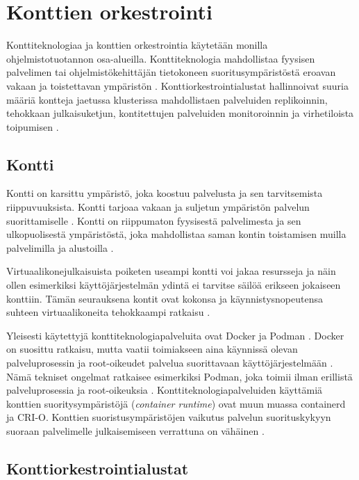 \chapter{Konttien orkestrointi\label{orchestration}}

Konttiteknologiaa ja konttien orkestrointia käytetään monilla ohjelmistotuotannon osa-alueilla.
Konttiteknologia mahdollistaa fyysisen palvelimen tai ohjelmistökehittäjän tietokoneen suoritusympäristöstä eroavan vakaan ja toistettavan ympäristön \cite{Watada19}.
Konttiorkestrointialustat hallinnoivat suuria määriä kontteja jaetussa klusterissa mahdollistaen palveluiden replikoinnin, tehokkaan julkaisuketjun, kontitettujen palveluiden monitoroinnin ja virhetiloista toipumisen \cite{Khan17}.

\section{Kontti\label{container}}

Kontti on karsittu ympäristö, joka koostuu palvelusta ja sen tarvitsemista riippuvuuksista.
Kontti tarjoaa vakaan ja suljetun ympäristön palvelun suorittamiselle \cite{Watada19}.
Kontti on riippumaton fyysisestä palvelimesta ja sen ulkopuolisestä ympäristöstä, joka mahdollistaa saman kontin toistamisen muilla palvelimilla ja alustoilla \cite{Saha18}.

Virtuaalikonejulkaisuista poiketen useampi kontti voi jakaa resursseja ja näin ollen esimerkiksi käyttöjärjestelmän ydintä ei tarvitse säilöä erikseen jokaiseen konttiin.
Tämän seurauksena kontit ovat kokonsa ja käynnistysnopeutensa suhteen virtuaalikoneita tehokkaampi ratkaisu \cite{Dua14}.

Yleisesti käytettyjä konttiteknologiapalveluita ovat Docker ja Podman \cite{Abraham20, Bernstein14}.
Docker on suosittu ratkaisu, mutta vaatii toimiakseen aina käynnissä olevan palveluprosessin ja root-oikeudet palvelua suorittavaan käyttöjärjestelmään \cite{Abraham20}.
Nämä tekniset ongelmat ratkaisee esimerkiksi Podman, joka toimii ilman erillistä palveluprosessia ja root-oikeuksia \cite{Gantikow20}.
Konttiteknologiapalveluiden käyttämiä konttien suoritysympäristöjä (\textit{container runtime}) ovat muun muassa containerd ja CRI-O.
Konttien suoristusympäristöjen vaikutus palvelun suorituskykyyn suoraan palvelimelle julkaisemiseen verrattuna on vähäinen \cite{torrez19, espe20}.

\section{Konttiorkestrointialustat\label{platforms}}

